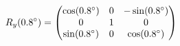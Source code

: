 \documentclass[preview]{standalone}
\begin{document}
\begin{align*}
\special{dvisvgm:raw <g id='unique000'>}R_y(0.8^\circ) = \begin{pmatrix} \cos(0.8^\circ) & 0 & -\sin(0.8^\circ) \\ 0 & 1 & 0 \\ \sin(0.8^\circ) & 0 & \cos(0.8^\circ) \end{pmatrix}\special{dvisvgm:raw </g>}
\end{align*}
\end{document}

